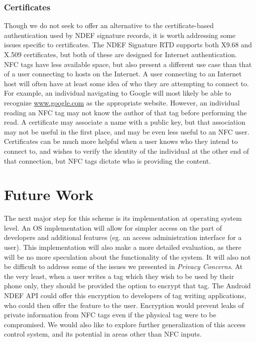\documentclass[12pt]{article}
\begin{document}
\subsubsection{Certificates}
Though we do not seek to offer an alternative to the certificate-based authentication used by NDEF signature records, it is worth addressing some issues specific to certificates.
The NDEF Signature RTD supports both X9.68 and X.509 certificates, but both of these are designed for Internet authentication.
NFC tags have less available space, but also present a different use case than that of a user connecting to hosts on the Internet.
A user connecting to an Internet host will often have at least some idea of who they are attempting to connect to.
For example, an individual navigating to Google will most likely be able to recognize \url{www.google.com} as the appropriate website.
However, an individual reading an NFC tag may not know the author of that tag before performing the read.
A certificate may associate a name with a public key, but that association may not be useful in the first place\cite{ellison2000}, and may be even less useful to an NFC user.
Certificates can be much more helpful when a user knows who they intend to connect to, and wishes to verify the identity of the individual at the other end of that connection, but NFC tags dictate who is providing the content.

\section{Future Work}
\label{sec:futurework}
The next major step for this scheme is its implementation at operating system level.
An OS implementation will allow for simpler access on the part of developers and additional features (eg. an access administration interface for a user).
This implementation will also make a more detailed evaluation, as there will be no more speculation about the functionality of the system.
It will also not be difficult to address some of the issues we presented in \textit{Privacy Concerns}.
At the very least, when a user writes a tag which they wish to be used by their phone only, they should be provided the option to encrypt that tag.
The Android NDEF API could offer this encryption to developers of tag writing applications, who could then offer the feature to the user.
Encryption would prevent leaks of private information from NFC tags even if the physical tag were to be compromised.
We would also like to explore further generalization of this access control system, and its potential in areas other than NFC inputs.
\end{document}
